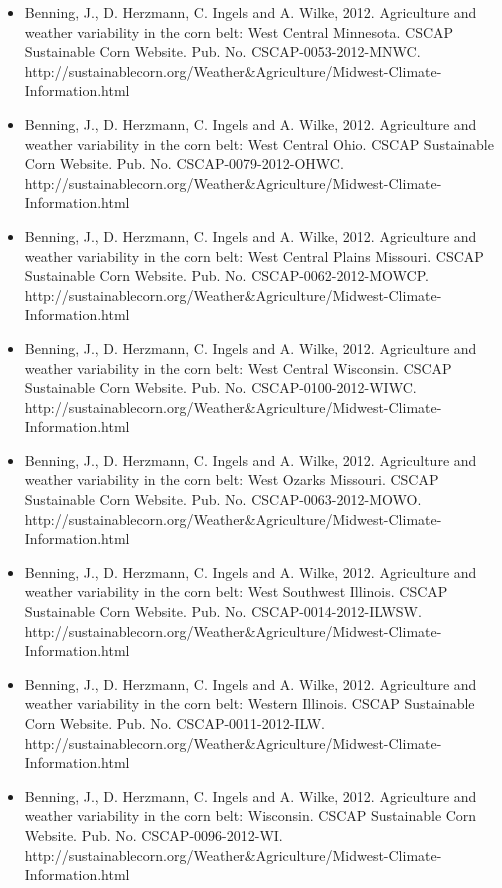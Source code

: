 \begin{itemize}
\item Benning, J., D. Herzmann, C. Ingels and A. Wilke, 2012. Agriculture and weather variability in the corn belt: West Central Minnesota. CSCAP Sustainable Corn Website. Pub. No. CSCAP-0053-2012-MNWC. http://sustainablecorn.org/Weather\&Agriculture/Midwest-Climate-Information.html

\item Benning, J., D. Herzmann, C. Ingels and A. Wilke, 2012. Agriculture and weather variability in the corn belt: West Central Ohio. CSCAP Sustainable Corn Website. Pub. No. CSCAP-0079-2012-OHWC. http://sustainablecorn.org/Weather\&Agriculture/Midwest-Climate-Information.html

\item Benning, J., D. Herzmann, C. Ingels and A. Wilke, 2012. Agriculture and weather variability in the corn belt: West Central Plains Missouri. CSCAP Sustainable Corn Website. Pub. No. CSCAP-0062-2012-MOWCP. http://sustainablecorn.org/Weather\&Agriculture/Midwest-Climate-Information.html

\item Benning, J., D. Herzmann, C. Ingels and A. Wilke, 2012. Agriculture and weather variability in the corn belt: West Central Wisconsin. CSCAP Sustainable Corn Website. Pub. No. CSCAP-0100-2012-WIWC. http://sustainablecorn.org/Weather\&Agriculture/Midwest-Climate-Information.html

\item Benning, J., D. Herzmann, C. Ingels and A. Wilke, 2012. Agriculture and weather variability in the corn belt: West Ozarks Missouri. CSCAP Sustainable Corn Website. Pub. No. CSCAP-0063-2012-MOWO. http://sustainablecorn.org/Weather\&Agriculture/Midwest-Climate-Information.html

\item Benning, J., D. Herzmann, C. Ingels and A. Wilke, 2012. Agriculture and weather variability in the corn belt: West Southwest Illinois. CSCAP Sustainable Corn Website. Pub. No. CSCAP-0014-2012-ILWSW. http://sustainablecorn.org/Weather\&Agriculture/Midwest-Climate-Information.html

\item Benning, J., D. Herzmann, C. Ingels and A. Wilke, 2012. Agriculture and weather variability in the corn belt: Western Illinois. CSCAP Sustainable Corn Website. Pub. No. CSCAP-0011-2012-ILW. http://sustainablecorn.org/Weather\&Agriculture/Midwest-Climate-Information.html

\item Benning, J., D. Herzmann, C. Ingels and A. Wilke, 2012. Agriculture and weather variability in the corn belt: Wisconsin. CSCAP Sustainable Corn Website. Pub. No. CSCAP-0096-2012-WI. http://sustainablecorn.org/Weather\&Agriculture/Midwest-Climate-Information.html


\end{itemize}
